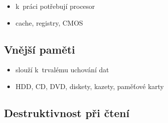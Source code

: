 \documentclass[a4paper,12pt]{article}
\providecommand{\tightlist}{%
\setlength{\itemsep}{0pt}\setlength{\parskip}{0pt}}
\begin{document}
\begin{itemize}
\tightlist
\item k~práci potřebují procesor
\item cache, registry, CMOS
\end{itemize}

\subsection{Vnější paměti}

\begin{itemize}
\tightlist
\item slouží k~trvalému uchování dat
\item HDD, CD, DVD, diskety, kazety, paměťové karty
\end{itemize}

\subsection{Destruktivnost při čtení}
\end{document}
